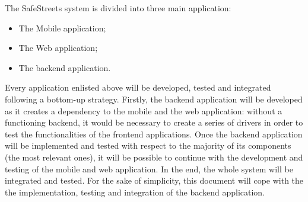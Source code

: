 The SafeStreets system is divided into three main application:
\begin{itemize}
    \item The Mobile application;
    \item The Web application;
    \item The backend application.
\end{itemize}
Every application enlisted above will be developed, tested and integrated following a bottom-up strategy. Firstly, the backend application will be developed as it creates a dependency to the mobile and the web application: without a functioning backend, it would be necessary to create a series of drivers in order to test the functionalities of the frontend applications. Once the backend application will be implemented and tested with respect to the majority of its components (the most relevant ones), it will be possible to continue with the development and testing of the mobile and web application. In the end, the whole system will be integrated and tested.
For the sake of simplicity, this document will cope with the the implementation, testing and integration of the backend application.
